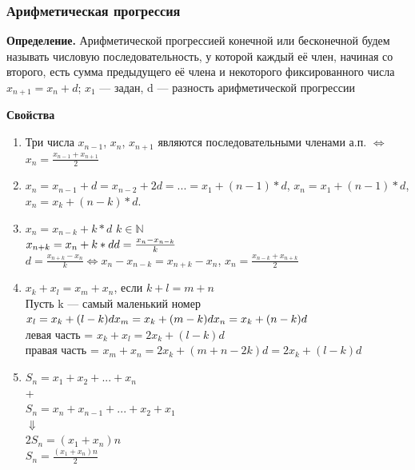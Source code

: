 \documentclass{article}
\begin{document}
    \subsubsection{Арифметическая прогрессия}
    
    \textbf{Определение.} Арифметической прогрессией конечной или бесконечной будем называть числовую последовательность, у которой каждый её член, начиная со второго, есть сумма предыдущего её члена и некоторого фиксированного числа
    \\ \(x_{n+1} = x_n + d\); \(x_1\) --- задан, d --- разность арифметической прогрессии
    
    \textbf{Свойства}
    
    \begin{enumerate}
    	\item Три числа \(x_{n-1}\), \(x_{n}\), \(x_{n+1}\) являются последовательными членами а.п. \(\Leftrightarrow\) \(x_n = \frac{x_{n-1} + x_{n+1}}{2}\)
        \item \(x_n = x_{n-1} + d = x_{n-2} + 2d = ... = x_1 + (n-1)*d\), \(x_n = x_1 + (n-1)*d\), \(x_n = x_k + (n-k)*d\).
        \item \(x_n = x_{n-k} + k*d\) \(k \in \mathbb{N}\)
        \\ \(x_{n+k} = x_n + k*d\\ d = \frac{x_n - x_{n-k}}{k}\)
        \\ \(d = \frac{x_{n+k} - x_n}{k} \Leftrightarrow x_n - x_{n-k} = x_{n+k} - x_n\), \(x_n = \frac{x_{n-k} + x_{n+k}}{2}\)
		\item \(x_k + x_l = x_m + x_n\), если \(k + l = m + n\)
        \\ Пусть k --- самый маленький номер 
        \\ \(x_l = x_k + (l-k)d\\ x_m = x_k + (m - k)d\\ x_n = x_k + (n-k)d\)
        \\ левая часть = \(x_k + x_l = 2x_k + (l-k)d\)
        \\ правая часть = \(x_m + x_n = 2x_k + (m+n-2k)d = 2x_k + (l-k)d\)
        \item \(S_n = x_1 + x_2 + ... + x_n\)
        \\+
        \\ \(S_n = x_n + x_{n-1} + ... + x_2 + x_1\)
        \\ \(\Downarrow\)
        \\ \(2S_n = (x_1 + x_n)n\)
        \\ \(S_n = \frac{(x_1 + x_n)n}{2}\)
    \end{enumerate}
    
\end{document}
